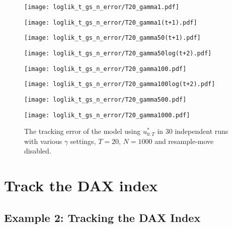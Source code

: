 \begin{figure}[!thbp]
    \centering
    \begin{minipage}{.5\textwidth}
        \centering
        \texttt{[image: loglik\_t\_gs\_n\_error/T20\_gamma1.pdf]}
    \end{minipage}%
    \begin{minipage}{0.5\textwidth}
        \centering
        \texttt{[image: loglik\_t\_gs\_n\_error/T20\_gamma1(t+1).pdf]}
    \end{minipage}
    \begin{minipage}{0.5\textwidth}
        \centering
        \texttt{[image: loglik\_t\_gs\_n\_error/T20\_gamma50(t+1).pdf]}
    \end{minipage}%
    \begin{minipage}{0.5\textwidth}
        \centering
        \texttt{[image: loglik\_t\_gs\_n\_error/T20\_gamma50log(t+2).pdf]}
    \end{minipage}
    \begin{minipage}{0.5\textwidth}
        \centering
        \texttt{[image: loglik\_t\_gs\_n\_error/T20\_gamma100.pdf]}
    \end{minipage}%
    \begin{minipage}{0.5\textwidth}
        \centering
        \texttt{[image: loglik\_t\_gs\_n\_error/T20\_gamma100log(t+2).pdf]}
    \end{minipage}
    \begin{minipage}{0.5\textwidth}
        \centering
        \texttt{[image: loglik\_t\_gs\_n\_error/T20\_gamma500.pdf]}
    \end{minipage}%
    \begin{minipage}{0.5\textwidth}
        \centering
        \texttt{[image: loglik\_t\_gs\_n\_error/T20\_gamma1000.pdf]}
    \end{minipage}
    \caption{The tracking error of the model using $u^*_{0:T}$ in 30 independent runs with various $\gamma$ settings, $T=20$, $N=1000$ and resample-move disabled.}
    \label{fig:error}
\end{figure}


\chapter{Track the DAX index}
\graphicspath{{Chapter4/figures/}}
\label{cha:Application}

\section{Example 2: Tracking the DAX Index}
\label{sec:exp2}
 
